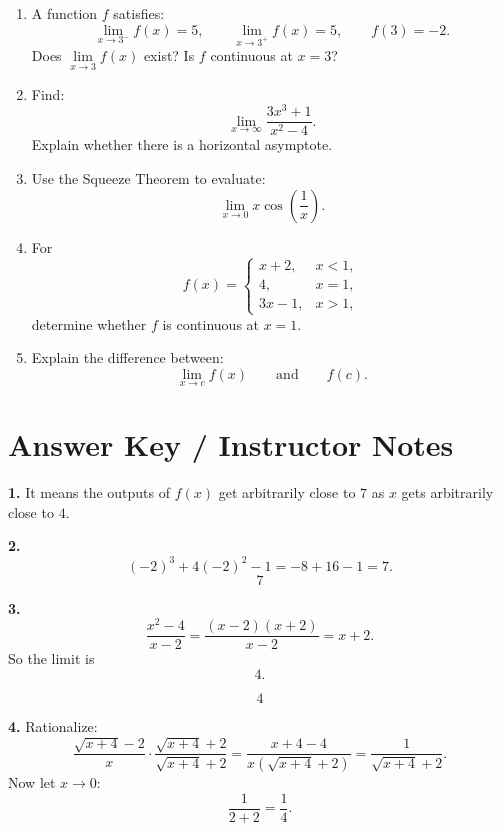 \documentclass[11pt]{article}
\begin{document}
\begin{enumerate}[start=11]
    \item A function $f$ satisfies:
    \[
    \lim_{x\to 3^-}f(x)=5,
    \qquad
    \lim_{x\to 3^+}f(x)=5,
    \qquad
    f(3)=-2.
    \]
    Does $\lim\limits_{x\to 3}f(x)$ exist? Is $f$ continuous at $x=3$?

    \item Find:
    \[
    \lim_{x\to \infty}\frac{3x^3+1}{x^2-4}.
    \]
    Explain whether there is a horizontal asymptote.

    \item Use the Squeeze Theorem to evaluate:
    \[
    \lim_{x\to 0}x\cos\left(\frac{1}{x}\right).
    \]

    \item For
    \[
    f(x)=
    \begin{cases}
    x+2, & x<1,\\
    4, & x=1,\\
    3x-1, & x>1,
    \end{cases}
    \]
    determine whether $f$ is continuous at $x=1$.

    \item Explain the difference between:
    \[
    \lim_{x\to c}f(x)
    \qquad\text{and}\qquad
    f(c).
    \]
\end{enumerate}

\newpage

%
%
%
\section*{Answer Key / Instructor Notes}

\textbf{1.} It means the outputs of $f(x)$ get arbitrarily close to $7$ as $x$ gets arbitrarily close to $4$.

\bigskip

\textbf{2.}
\[
(-2)^3+4(-2)^2-1=-8+16-1=7.
\]
\[
\boxed{7}
\]

\bigskip

\textbf{3.}
\[
\frac{x^2-4}{x-2}=\frac{(x-2)(x+2)}{x-2}=x+2.
\]
So the limit is
\[
4.
\]

\[
\boxed{4}
\]

\bigskip

\textbf{4.}
Rationalize:
\[
\frac{\sqrt{x+4}-2}{x}\cdot \frac{\sqrt{x+4}+2}{\sqrt{x+4}+2}
=
\frac{x+4-4}{x(\sqrt{x+4}+2)}
=
\frac{1}{\sqrt{x+4}+2}.
\]
Now let $x\to 0$:
\[
\frac{1}{2+2}=\frac14.
\]
\end{document}
